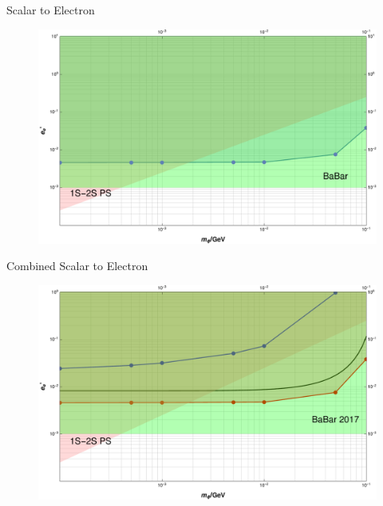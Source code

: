 \documentclass[11pt]{beamer}
\numberwithin{equation}{section}
\begin{document}
\begin{frame}{Scalar to Electron}
\begin{figure}[H]
  \centering
    \includegraphics[width=\textwidth]{../imgs/PionSpectrumScalar}
\end{figure}
\end{frame}

\begin{frame}{Combined Scalar to Electron}
\begin{figure}[H]
  \centering
    \includegraphics[width=\textwidth]{../imgs/combinedScalar}
\end{figure}
\end{frame}
\end{document}
